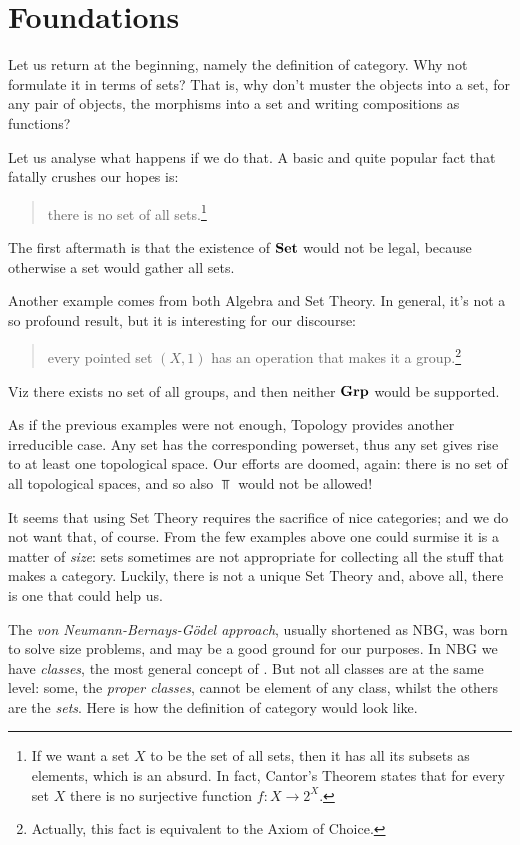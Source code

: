 
\section{Foundations}

Let us return at the beginning, namely the definition of category. Why not formulate it in terms of sets? That is, why don't muster the objects into a set, for any pair of objects, the morphisms into a set and writing compositions as functions?

Let us analyse what happens if we do that. A basic and quite popular fact that fatally crushes our hopes is:
\begin{quotation}
there is no set of all sets.\footnote{If we want a set \(X\) to be the set of all sets, then it has all its subsets as elements, which is an absurd. In fact, Cantor's Theorem states that for every set \(X\) there is no surjective function \(f : X \to 2^X\).}
\end{quotation}
The first aftermath is that the existence of \(\mathbf{Set}\) would not be legal, because otherwise a set would gather all sets.

Another example comes from both Algebra and Set Theory. In general, it's not a so profound result, but it is interesting for our discourse:
\begin{quotation}
every pointed set \((X, 1)\) has an operation that makes it a group.\footnote{Actually, this fact is equivalent to the Axiom of Choice.}
\end{quotation}
Viz there exists no set of all groups, and then neither \(\mathbf{Grp}\) would be supported.

As if the previous examples were not enough, Topology provides another irreducible case. Any set has the corresponding powerset, thus any set gives rise to at least one topological space. Our efforts are doomed, again: there is no set of all topological spaces, and so also \(\Top\) would not be allowed!

It seems that using Set Theory requires the sacrifice of nice categories; and we do not want that, of course. From the few examples above one could surmise it is a matter of {\em size}: sets sometimes are not appropriate for collecting all the stuff that makes a category. Luckily, there is not a unique Set Theory and, above all, there is one that could help us.

The {\em von Neumann-Bernays-G\"odel approach}, usually shortened as NBG, was born to solve size problems, and may be a good ground for our purposes. In NBG we have {\em classes}, the most general concept of . But not all classes are at the same level: some, the {\em proper classes}, cannot be element of any class, whilst the others are the {\em sets}. Here is how the definition of category would look like. 

